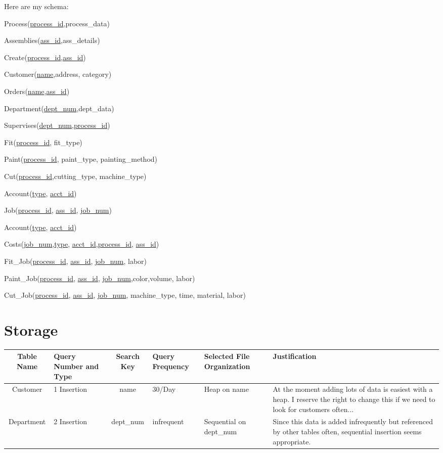 \documentclass[11pt]{article}
\begin{document}
\indent Here are my schema:

Process(\underline{process\_id},process\_data)

Assemblies(\underline{ass\_id},ass\_details)

Create(\underline{process\_id},\underline{ass\_id})

Customer(\underline{name},address, category)

Orders(\underline{name},\underline{ass\_id})

Department(\underline{dept\_num},dept\_data)

Supervises(\underline{dept\_num},\underline{process\_id})

Fit(\underline{process\_id}, fit\_type)

Paint(\underline{process\_id}, paint\_type, painting\_method)

Cut(\underline{process\_id},cutting\_type, machine\_type)

Account(\underline{type}, \underline{acct\_id})

Job(\underline{process\_id}, \underline{ass\_id}, \underline{job\_num})

Account(\underline{type}, \underline{acct\_id})

Costs(\underline{job\_num},\underline{type}, \underline{acct\_id},\underline{process\_id}, \underline{ass\_id})

Fit\_Job(\underline{process\_id}, \underline{ass\_id}, \underline{job\_num}, labor)

Paint\_Job(\underline{process\_id}, \underline{ass\_id}, \underline{job\_num},color,volume, labor)

Cut\_Job(\underline{process\_id}, \underline{ass\_id}, \underline{job\_num}, machine\_type, time, material, labor)

\newpage
\section{Storage}

\begin{tabular}{|c|p{.75in}|c|p{.75in}|p{.75in}|p{.75in}|}\hline
Table Name & Query Number and Type & Search Key& Query Frequency& Selected File Organization & Justification\\ \hline\hline
Customer & 1 Insertion & name & 30/Day & Heap on name & At the moment adding lots of data is easiest with a heap.  I reserve the right to change this if we need to look for customers often...\\ \hline 
Department & 2 Insertion& dept\_num & infrequent & Sequential on dept\_num & Since this data is added infrequently but referenced by other tables often, sequential insertion seems appropriate.\\ \hline




\end{tabular}
\end{document}
